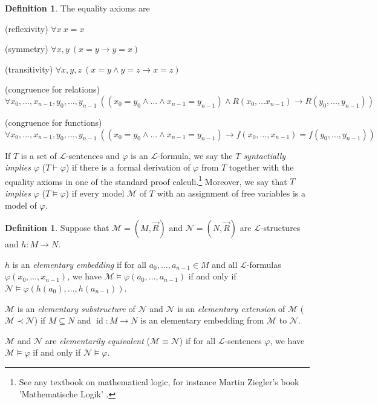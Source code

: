 \documentclass[10pt]{amsart}
\renewcommand{\L}{\mathcal{L}}
\newcommand{\id}{\operatorname{id}}
\newcommand{\MM}{\mathcal{M}}
\newcommand{\NN}{\mathcal{N}}
\theoremstyle{definition}
\newtheorem{definition}[theorem]{Definition}
\theoremstyle{remark}
\newenvironment{enumerate-(a)}{\begin{enumerate}[label={\upshape (\alph*)}, leftmargin=2pc]}{\end{enumerate}}
\begin{document}
\begin{definition} 
The equality axioms are 
\begin{enumerate-(a)} 
\item 
(reflexivity) $\forall x\ x=x$ 
\item 
(symmetry) 
$\forall x,y\ (x=y\rightarrow y=x)$ 
\item 
(transitivity) 
$\forall x,y,z\ (x=y\wedge y=z\rightarrow x=z)$ 
\item 
(congruence for relations) 
$\forall x_0,\dots,x_{n-1},y_0,\dots,y_{n-1}\ ((x_0=y_0\wedge\dots\wedge x_{n-1}=y_{n-1})\wedge R(x_0,\dots x_{n-1})\rightarrow R(y_0,\dots, y_{n-1}))$ 
\item 
(congruence for functions) 
$\forall x_0,\dots,x_{n-1},y_0,\dots,y_{n-1}\ ((x_0=y_0\wedge\dots\wedge x_{n-1}=y_{n-1})\rightarrow f(x_0,\dots, x_{n-1})=f(y_0,\dots, y_{n-1}))$ 
\end{enumerate-(a)} 
\end{definition} 

If $T$ is a set of $\L$-sentences and $\varphi$ is an $\L$-formula, we say the \emph{$T$ syntactially implies $\varphi$} ($T\vdash \varphi$) if there is a formal derivation of $\varphi$ from $T$ together with the equality axioms in one of the standard proof calculi.\footnote{See any textbook on mathematical logic, for instance Martin Ziegler's book 'Mathematische Logik' \cite{MR2683672}. } Moreover, we say that $T$ \emph{implies} $\varphi$ ($T\models \varphi$) if every model $\MM$ of $T$ with an assignment of free variables is a model of $\varphi$. 

\begin{definition} 
Suppose that $\MM=(M,\vec{R})$ and $\NN=(N,\vec{R})$ are $\L$-structures and $h\colon M\rightarrow N$. 
\begin{enumerate-(a)} 
\item 
$h$ is an \emph{elementary embedding} if for all $a_0,\dots,a_{n-1}\in M$ and all $\L$-formulas $\varphi(x_0,\dots,x_{n-1})$, we have $\MM\vDash \varphi(a_0,\dots,a_{n-1})$ if and only if $\NN\vDash \varphi(h(a_0),\dots,h(a_{n-1}))$. 
\item 
$\MM$ is an \emph{elementary substructure} of $\NN$ and $\NN$ is an \emph{elementary extension} of $\MM$ ($\MM\prec \NN$) if $M\subseteq N$ and $\id\colon M\rightarrow N$ is an elementary embedding from $\MM$ to $\NN$. 
\item 
$\MM$ and $\NN$ are \emph{elementarily equivalent} ($\MM\equiv\NN$) if for all $\L$-sentences $\varphi$, we have $\MM\models \varphi$ if and only if $\NN\models \varphi$. 
\end{enumerate-(a)} 
\end{definition} 
\end{document}
